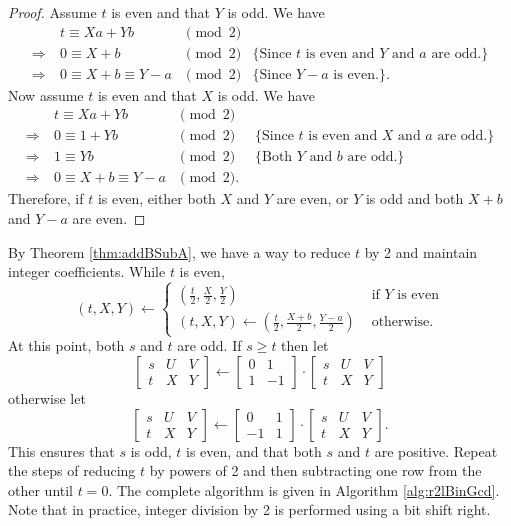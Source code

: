 \documentclass{ucalgthes1}
\theoremstyle{definition}
\newcommand{\matrixtt}[4]{\left[ \begin{array}{rr} #1 & #2 \\ #3 & #4 \end{array} \right]}
\newcommand{\matrixThreeTwo}[6]{\left[ \begin{array}{rrr} #1 & #2 & #3 \\ #4 & #5 & #6 \end{array} \right]}
\begin{document}
\begin{proof}
Assume $t$ is even and that $Y$ is odd.  We have
\[
\begin{array}{rllr}
	         & t \equiv Xa + Yb & \pmod 2 \\
\Rightarrow~ & 0 \equiv X + b & \pmod 2 & \textrm{\{Since $t$ is even and $Y$ and $a$ are odd.\}} \\
\Rightarrow~ & 0 \equiv X + b \equiv Y - a & \pmod 2 & \textrm{\{Since $Y-a$ is even.\}}. 
\end{array}
\]
Now assume $t$ is even and that $X$ is odd.  We have
\[
\begin{array}{rllr}
	         & t \equiv Xa + Yb & \pmod 2 \\
\Rightarrow~ & 0 \equiv 1 + Yb & \pmod 2 & \textrm{ \{Since $t$ is even and $X$ and $a$ are odd.\}} \\
\Rightarrow~ & 1 \equiv Yb & \pmod 2 & \textrm{ \{Both $Y$ and $b$ are odd.\}} \\
\Rightarrow~ & 0 \equiv X + b \equiv Y - a & \pmod 2. 
\end{array}
\]
Therefore, if $t$ is even, either both $X$ and $Y$ are even, or $Y$ is odd and both $X+b$ and $Y-a$ are even.
\end{proof}

By Theorem \ref{thm:addBSubA}, we have a way to reduce $t$ by 2 and maintain integer coefficients.  While $t$ is even, 
\[
	(t, X, Y) \gets \begin{cases}
		\left( \frac{t}{2}, \frac{X}{2}, \frac{Y}{2} \right) &
			\textrm{ if $Y$ is even} \\
		(t, X, Y) \gets \left( \frac{t}{2}, \frac{X+b}{2}, \frac{Y-a}{2} \right) & 
			\textrm{ otherwise.}
	\end{cases}
\]
At this point, both $s$ and $t$ are odd.  If $s \ge t$ then let
\[
	\matrixThreeTwo{s}{U}{V}{t}{X}{Y} \gets \matrixtt{0}{1}{1}{-1} \cdot \matrixThreeTwo{s}{U}{V}{t}{X}{Y}
\]
otherwise let
\[
	\matrixThreeTwo{s}{U}{V}{t}{X}{Y} \gets \matrixtt{0}{1}{-1}{1} \cdot \matrixThreeTwo{s}{U}{V}{t}{X}{Y}.
\]
This ensures that $s$ is odd, $t$ is even, and that both $s$ and $t$ are positive.  Repeat the steps of reducing $t$ by powers of 2 and then subtracting one row from the other until $t=0$.  The complete algorithm is given in Algorithm \ref{alg:r2lBinGcd}.  Note that in practice, integer division by 2 is performed using a bit shift right.
\end{document}
